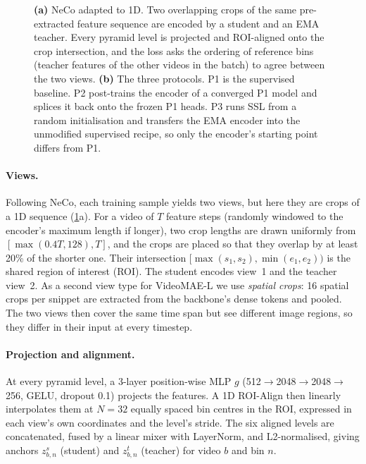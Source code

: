 \documentclass[10pt,a4paper]{article}
\begin{document}
\begin{figure}[t]
\caption{\textbf{(a)} NeCo adapted to 1D. Two overlapping crops of the same pre-extracted
feature sequence are encoded by a student and an EMA teacher. Every pyramid level is
projected and ROI-aligned onto the crop intersection, and the loss asks the ordering of
reference bins (teacher features of the other videos in the batch) to agree between the
two views. \textbf{(b)} The three protocols. P1 is the supervised baseline. P2 post-trains
the encoder of a converged P1 model and splices it back onto the frozen P1 heads. P3
runs SSL from a random initialisation and transfers the EMA encoder into the
unmodified supervised recipe, so only the encoder's starting point differs from P1.}
\label{fig:method}
\end{figure}

\paragraph{Views.} Following NeCo, each training sample yields two views, but here they
are crops of a 1D sequence (\cref{fig:method}a). For a video of $T$ feature steps
(randomly windowed to the encoder's maximum length if longer), two crop lengths are drawn
uniformly from $[\max(0.4T, 128), T]$, and the crops are placed so that they overlap by at
least 20\% of the shorter one. Their intersection $[\max(s_1,s_2), \min(e_1,e_2))$ is the
shared region of interest (ROI). The student encodes view~1 and the teacher view~2. As a
second view type for VideoMAE-L we use \emph{spatial crops}: 16 spatial crops per snippet
are extracted from the backbone's dense tokens and pooled. The two views then cover the
same time span but see different image regions, so they differ in their input at every
timestep.

\paragraph{Projection and alignment.} At every pyramid level, a 3-layer position-wise MLP
$g$ (512$\to$2048$\to$2048$\to$256, GELU, dropout 0.1) projects the features. A 1D
ROI-Align then linearly interpolates them at $N{=}32$ equally spaced bin centres in
the ROI, expressed in each view's own coordinates and the level's stride. The six aligned
levels are concatenated, fused by a linear mixer with LayerNorm, and L2-normalised, giving
anchors $z^{s}_{b,n}$ (student) and $z^{t}_{b,n}$ (teacher) for video $b$ and bin $n$.
\end{document}
